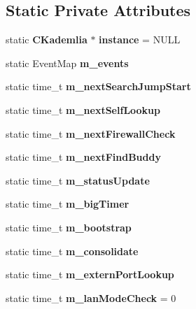 \subsection*{Static Private Attributes}
\begin{DoxyCompactItemize}
\item 
static {\bf CKademlia} $\ast$ {\bfseries instance} = NULL\label{classKademlia_1_1CKademlia_adc11f47d6cc9179f694e8241e6846ad5}

\item 
static EventMap {\bfseries m\_\-events}\label{classKademlia_1_1CKademlia_a6474ca09c79e5e6ed7f00fa3ce3f95bf}

\item 
static time\_\-t {\bfseries m\_\-nextSearchJumpStart}\label{classKademlia_1_1CKademlia_a40440adcf4a7a45eafc4549a964e389b}

\item 
static time\_\-t {\bfseries m\_\-nextSelfLookup}\label{classKademlia_1_1CKademlia_add2f936df18ec9bdb8fe9811aae4c850}

\item 
static time\_\-t {\bfseries m\_\-nextFirewallCheck}\label{classKademlia_1_1CKademlia_a8c9b68fb8b15ed3fd541b8ee06ec68af}

\item 
static time\_\-t {\bfseries m\_\-nextFindBuddy}\label{classKademlia_1_1CKademlia_aeee916254b5c8ce3306a0a71c79c393f}

\item 
static time\_\-t {\bfseries m\_\-statusUpdate}\label{classKademlia_1_1CKademlia_ac63477ba8b94481bc091715c5d6b04b1}

\item 
static time\_\-t {\bfseries m\_\-bigTimer}\label{classKademlia_1_1CKademlia_a08ac60c7b37547738839cf066ef19548}

\item 
static time\_\-t {\bfseries m\_\-bootstrap}\label{classKademlia_1_1CKademlia_a468746e9c250b7d5163ccdba93511353}

\item 
static time\_\-t {\bfseries m\_\-consolidate}\label{classKademlia_1_1CKademlia_a4732f782b657611c2a7ba89fe9860303}

\item 
static time\_\-t {\bfseries m\_\-externPortLookup}\label{classKademlia_1_1CKademlia_a438c72d7b056a94ba75c5d622dfd827e}

\item 
static time\_\-t {\bfseries m\_\-lanModeCheck} = 0\label{classKademlia_1_1CKademlia_ab894eebeae31c04c843b10c5d9f12b61}


\end{DoxyCompactItemize}
